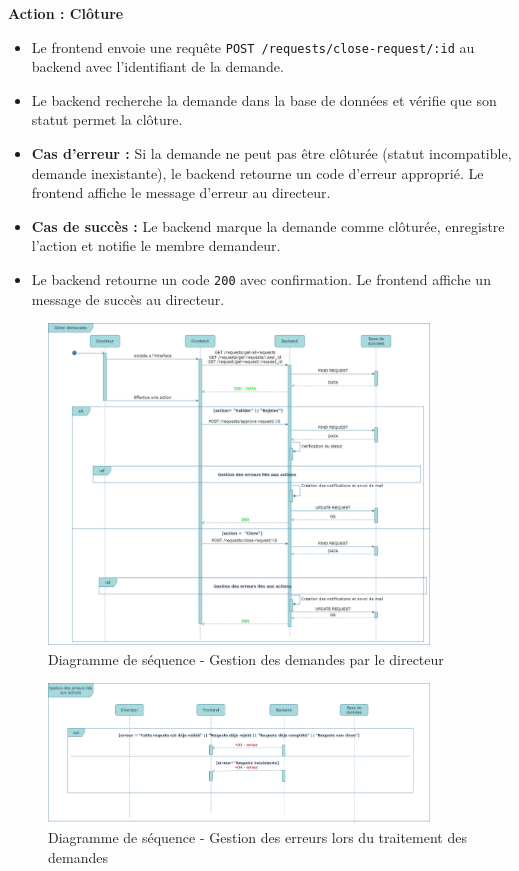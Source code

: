 \begin{enumerate}
  \textbf{Action : Clôture}
  \begin{itemize}
      \item Le frontend envoie une requête \texttt{POST /requests/close-request/:id} au backend avec l'identifiant de la demande.
      \item Le backend recherche la demande dans la base de données et vérifie que son statut permet la clôture.
      \item \textbf{Cas d'erreur :} Si la demande ne peut pas être clôturée (statut incompatible, demande inexistante), le backend retourne un code d'erreur approprié. Le frontend affiche le message d'erreur au directeur.
      \item \textbf{Cas de succès :} Le backend marque la demande comme clôturée, enregistre l'action et notifie le membre demandeur.
      \item Le backend retourne un code \texttt{200} avec confirmation. Le frontend affiche un message de succès au directeur.
  \end{itemize}
\end{enumerate}

\begin{figure}[H]
  \centering
  \includegraphics[width=0.9\textwidth]{images/diagramme_de_sequence/gestion_des_demandes_par_le_directeur.drawio.png}
  \caption{Diagramme de séquence - Gestion des demandes par le directeur}
  \label{fig:seq_gestion_demandes}
\end{figure}

\begin{figure}[H]
  \centering
  \includegraphics[width=0.9\textwidth]{images/diagramme_de_sequence/gestion_erreurs_demandes.png}
  \caption{Diagramme de séquence - Gestion des erreurs lors du traitement des demandes}
  \label{fig:seq_gestion_erreurs}
\end{figure}


